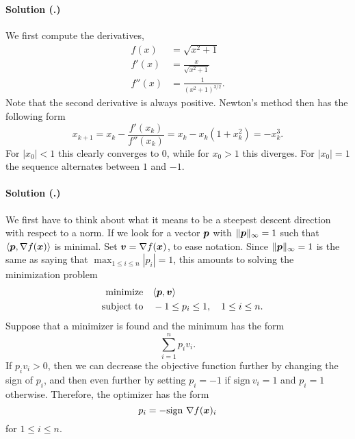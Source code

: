 \documentclass{article}
\newcounter{problemSheetNumber}
\newcounter{problems}
\renewcommand{\solution}[1]{\paragraph{Solution (\theproblemSheetNumber.\theproblems)}\addtocounter{problems}{1}\label{#1}}
\begin{document}
\solution{pr:5} We first compute the derivatives,
\begin{align*}
 f(x) &= \sqrt{x^2+1}\\
 f'(x) &= \frac{x}{\sqrt{x^2+1}}\\
 f''(x) &= \frac{1}{(x^2+1)^{3/2}}.
\end{align*}
Note that the second derivative is always positive.
Newton's method then has the following form
\begin{equation*}
 x_{k+1} = x_k - \frac{f'(x_k)}{f''(x_k)} = x_k - x_k(1+x_k^2) = -x_k^3.
\end{equation*}
For $|x_0|<1$ this clearly converges to $0$, while for $x_0>1$ this diverges. For $|x_0|=1$ the sequence alternates between $1$ and $-1$.

\solution{pr:6} We first have to think about what it means to be a steepest descent direction with respect to a norm. If we look for a vector $\bm{p}$ with $\Vert {\bm{p}}\Vert_\infty=1$ such that $\langle {\bm{p}}, {\nabla f(\bm{x})} \rangle$ is minimal. 
Set $\bm{v}=\nabla f(\bm{x})$, to ease notation. Since $\Vert {\bm{p}}\Vert_\infty = 1$ is the same as saying that $\max_{1\leq i\leq n} |p_i| = 1$, this amounts to solving the minimization problem
\begin{align*}
 \text{minimize}\quad& \langle {\bm{p}}, {\bm{v}} \rangle\\
 \quad\text{subject to}\quad & -1 \leq p_i \leq 1, \quad 1\leq i\leq n.
\end{align*}
Suppose that a minimizer is found and the minimum has the form
\begin{equation*}
 \sum_{i=1}^n p_i v_i.
\end{equation*}
If $p_iv_i>0$, then we can decrease the objective function further by changing the sign of $p_i$, and then even further by setting $p_i=-1$ if $\mathrm{sign} \ v_i=1$ and $p_i=1$ otherwise. Therefore, the optimizer has the form
\begin{equation*}
 p_i = -\mathrm{sign} \ \nabla f(\bm{x})_i
\end{equation*}
for $1\leq i\leq n$.
\end{document}
